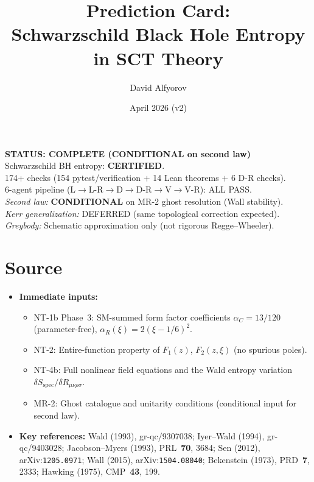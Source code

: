 \documentclass[11pt,a4paper]{article}
\title{%
  \textbf{Prediction Card:}\\[4pt]
  \Large Schwarzschild Black Hole Entropy in SCT Theory
}
\author{David Alfyorov}
\date{April 2026 (v2)}
\begin{document}
\maketitle

\begin{center}
\end{center}

\begin{center}
  \colorbox{statusgreen!15}{\parbox{0.82\textwidth}{\centering
    \textbf{\color{statusgreen} STATUS: COMPLETE (CONDITIONAL on second law)}\\[2pt]
    \small Schwarzschild BH entropy: \textbf{CERTIFIED}.\\
    174+ checks (154 pytest/verification $+$ 14 Lean theorems $+$ 6 D-R checks).\\[2pt]
    6-agent pipeline (L$\to$L-R$\to$D$\to$D-R$\to$V$\to$V-R): ALL PASS.\\[4pt]
    \textit{Second law:} \textbf{CONDITIONAL} on MR-2 ghost resolution (Wall stability).\\
    \textit{Kerr generalization:} DEFERRED (same topological correction expected).\\
    \textit{Greybody:} Schematic approximation only (not rigorous Regge--Wheeler).
  }}
\end{center}

\section{Source}

\begin{itemize}[leftmargin=2em]
  \item \textbf{Immediate inputs:}
  \begin{itemize}
    \item NT-1b Phase~3: SM-summed form factor coefficients
    $\alpha_C = 13/120$ (parameter-free), $\alpha_R(\xi) = 2(\xi-1/6)^2$.
    \item NT-2: Entire-function property of $F_1(z)$, $F_2(z,\xi)$ (no spurious poles).
    \item NT-4b: Full nonlinear field equations and the Wald entropy variation
    $\delta S_{\mathrm{spec}}/\delta R_{\mu\nu\rho\sigma}$.
    \item MR-2: Ghost catalogue and unitarity conditions (conditional input for second law).
  \end{itemize}
  \item \textbf{Key references:}
    Wald (1993), gr-qc/9307038;
    Iyer--Wald (1994), gr-qc/9403028;
    Jacobson--Myers (1993), PRL~\textbf{70}, 3684;
    Sen (2012), arXiv:\texttt{1205.0971};
    Wall (2015), arXiv:\texttt{1504.08040};
    Bekenstein (1973), PRD~\textbf{7}, 2333;
    Hawking (1975), CMP~\textbf{43}, 199.
\end{itemize}
\end{document}

